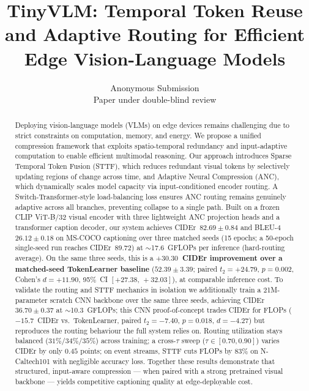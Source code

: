 \documentclass{article}
\title{TinyVLM: Temporal Token Reuse and Adaptive Routing for Efficient Edge Vision-Language Models}
\author{%
  Anonymous Submission \\
  Paper under double-blind review \\
}
\begin{document}
\maketitle


\begin{abstract}
Deploying vision-language models (VLMs) on edge devices remains challenging due to strict constraints on computation, memory, and energy. We propose a unified compression framework that exploits spatio-temporal redundancy and input-adaptive computation to enable efficient multimodal reasoning. Our approach introduces Sparse Temporal Token Fusion (STTF), which reduces redundant visual tokens by selectively updating regions of change across time, and Adaptive Neural Compression (ANC), which dynamically scales model capacity via input-conditioned encoder routing. A Switch-Transformer-style load-balancing loss ensures ANC routing remains genuinely adaptive across all branches, preventing collapse to a single path. Built on a frozen CLIP ViT-B/32 visual encoder with three lightweight ANC projection heads and a transformer caption decoder, our system achieves CIDEr~$\mathbf{82.69 \pm 0.84}$ and BLEU-4~$\mathbf{26.12 \pm 0.18}$ on MS-COCO captioning over three matched seeds (15 epochs; a 50-epoch single-seed run reaches CIDEr~$89.72$) at $\sim$17.6~GFLOPs per inference (hard-routing average). On the same three seeds, this is a \textbf{$+30.30$~CIDEr improvement over a matched-seed TokenLearner baseline} ($52.39 \pm 3.39$; paired $t_{2}{=}{+}24.79$, $p{=}0.002$, Cohen's $d{=}{+}11.90$, 95\%~CI $[{+}27.38,\,{+}32.03]$), at comparable inference cost. To validate the routing and STTF mechanics in isolation we additionally train a 21M-parameter scratch CNN backbone over the same three seeds, achieving CIDEr~$36.70 \pm 0.37$ at $\sim$10.3~GFLOPs; this CNN proof-of-concept trades CIDEr for FLOPs ($-15.7$~CIDEr vs.\ TokenLearner, paired $t_{2}{=}{-}7.40$, $p{=}0.018$, $d{=}{-}4.27$) but reproduces the routing behaviour the full system relies on. Routing utilization stays balanced ($31\%$/$34\%$/$35\%$) across training; a cross-$\tau$ sweep ($\tau \in [0.70, 0.90]$) varies CIDEr by only $0.45$ points; on event streams, STTF cuts FLOPs by $83\%$ on N-Caltech101 with negligible accuracy loss. Together these results demonstrate that structured, input-aware compression — when paired with a strong pretrained visual backbone — yields competitive captioning quality at edge-deployable cost.
\end{abstract}
\end{document}
